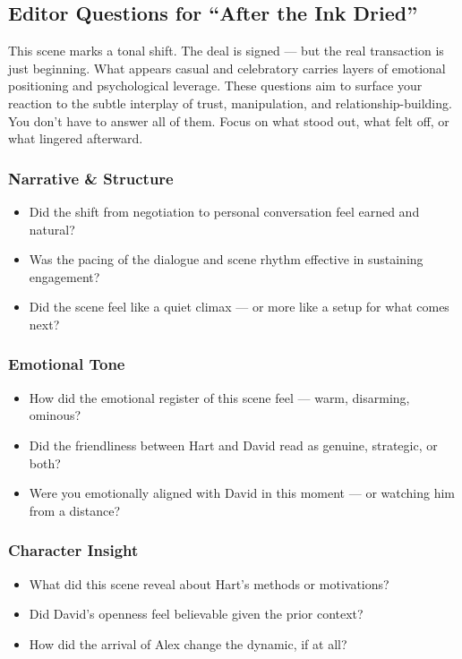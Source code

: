 \medskip

\subsection{Editor Questions for ``After the Ink Dried''}

This scene marks a tonal shift. The deal is signed — but the real transaction is just beginning. What appears casual and celebratory carries layers of emotional positioning and psychological leverage. These questions aim to surface your reaction to the subtle interplay of trust, manipulation, and relationship-building. You don’t have to answer all of them. Focus on what stood out, what felt off, or what lingered afterward.

\subsubsection{Narrative \& Structure}

\begin{itemize}
  \item Did the shift from negotiation to personal conversation feel earned and natural?
  \item Was the pacing of the dialogue and scene rhythm effective in sustaining engagement?
  \item Did the scene feel like a quiet climax — or more like a setup for what comes next?
\end{itemize}

\subsubsection{Emotional Tone}

\begin{itemize}
  \item How did the emotional register of this scene feel — warm, disarming, ominous?
  \item Did the friendliness between Hart and David read as genuine, strategic, or both?
  \item Were you emotionally aligned with David in this moment — or watching him from a distance?
\end{itemize}

\subsubsection{Character Insight}

\begin{itemize}
  \item What did this scene reveal about Hart’s methods or motivations?
  \item Did David’s openness feel believable given the prior context?
  \item How did the arrival of Alex change the dynamic, if at all?
\end{itemize}

